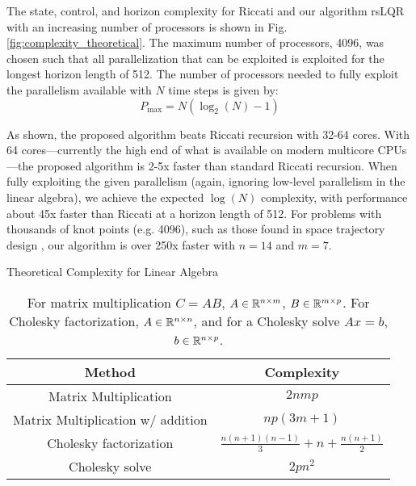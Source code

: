 \documentclass[../root.tex]{subfiles}
\newcommand{\0}{{\transparent{0} \resizebox{\mycellheight}{\mycellheight}{0}}}
\begin{document}
The state, control, and horizon complexity for Riccati and our algorithm rsLQR with an 
increasing number of processors is shown in Fig. \ref{fig:complexity_theoretical}.
The maximum number of processors, 4096, was chosen 
such that all parallelization that can be exploited is exploited for the longest horizon
length of 512. The number of processors needed to fully exploit the parallelism available
with $N$ time steps is given by:
\begin{equation}
    P_\text{max} = N \left(\log_2(N) - 1 \right)
\end{equation}

As shown, the proposed algorithm beats Riccati recursion with 32-64 cores.  With 64
cores---currently the high end of what is available on modern multicore CPUs---the proposed
algorithm is 2-5x faster than standard Riccati recursion. When fully exploiting the given
parallelism (again, ignoring low-level parallelism in the linear algebra), we achieve the
expected $\log(N)$ complexity, with performance about 45x faster than Riccati at a horizon
length of 512. For problems with thousands of knot points (e.g. 4096), such as those found
in space trajectory design \cite{tracy_LowThrust_2021}, our algorithm is over 250x faster 
with $n=14$ and $m=7$. 

\begin{table}
    \caption{Theoretical Complexity for Linear Algebra}
    \begin{tabular}{c c}
        Method & Complexity \\
        \midrule
        Matrix Multiplication & $2nmp$ \\
        Matrix Multiplication w/ addition & $n p (3m+1)$ \\
        Cholesky factorization & $ \frac{n (n+1) (n-1)}{3} + n + \frac{n(n+1)}{2}$ \\
        Cholesky solve & $2pn^2$ \\
    \end{tabular}
    \caption*{\small{For matrix multiplication $C = A B$, $A \in \mathbb{R}^{n \times m}$, $B \in \mathbb{R}^{m \times p}$. 
        For Cholesky factorization, $A \in \mathbb{R}^{n \times n}$, and for a Cholesky solve $A x = b$, 
        $b \in \mathbb{R}^{n \times p}$.}}
    \label{tab:linalg_complexity}
\end{table}
\end{document}
